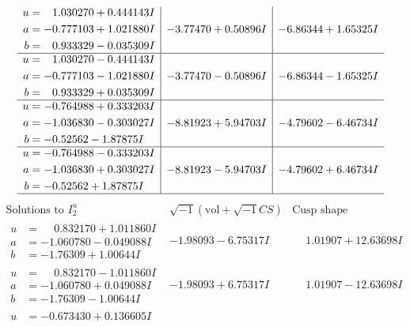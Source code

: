 \documentclass[1p]{elsarticle_modified}
\theoremstyle{definition}
\newcommand{\I}{\sqrt{-1}}
\begin{document}
$$\begin{array}{c|c|c}
\begin{aligned}
u &= \phantom{-}1.030270 + 0.444143 I \\
a &= -0.777103 + 1.021880 I \\
b &= \phantom{-}0.933329 - 0.035309 I\end{aligned}
 & -3.77470 + 0.50896 I & -6.86344 + 1.65325 I \\ \hline\begin{aligned}
u &= \phantom{-}1.030270 - 0.444143 I \\
a &= -0.777103 - 1.021880 I \\
b &= \phantom{-}0.933329 + 0.035309 I\end{aligned}
 & -3.77470 - 0.50896 I & -6.86344 - 1.65325 I \\ \hline\begin{aligned}
u &= -0.764988 + 0.333203 I \\
a &= -1.036830 - 0.303027 I \\
b &= -0.52562 - 1.87875 I\end{aligned}
 & -8.81923 + 5.94703 I & -4.79602 - 6.46734 I \\ \hline\begin{aligned}
u &= -0.764988 - 0.333203 I \\
a &= -1.036830 + 0.303027 I \\
b &= -0.52562 + 1.87875 I\end{aligned}
 & -8.81923 - 5.94703 I & -4.79602 + 6.46734 I\\
 \hline 
 \end{array}$$\newpage$$\begin{array}{c|c|c}  
\text{Solutions to }I^u_{2}& \I (\text{vol} + \sqrt{-1}CS) & \text{Cusp shape}\\
 \hline 
\begin{aligned}
u &= \phantom{-}0.832170 + 1.011860 I \\
a &= -1.060780 - 0.049088 I \\
b &= -1.76309 + 1.00644 I\end{aligned}
 & -1.98093 - 6.75317 I & \phantom{-}1.01907 + 12.63698 I \\ \hline\begin{aligned}
u &= \phantom{-}0.832170 - 1.011860 I \\
a &= -1.060780 + 0.049088 I \\
b &= -1.76309 - 1.00644 I\end{aligned}
 & -1.98093 + 6.75317 I & \phantom{-}1.01907 - 12.63698 I \\ \hline\begin{aligned}
u &= -0.673430 + 0.136605 I \\

\end{aligned}
\end{array}$$
\end{document}
